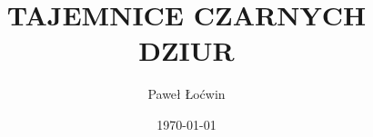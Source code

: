 \documentclass{beamer}
\title{TAJEMNICE CZARNYCH DZIUR}
\author{Paweł Łoćwin}
\date{\today}
\begin{document}
\frame{\titlepage}






\end{document}
